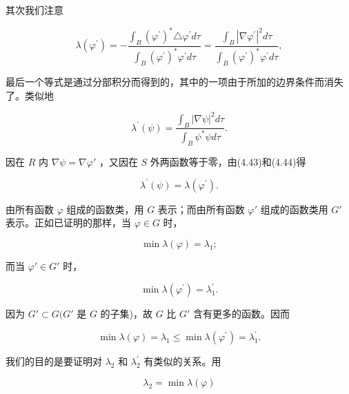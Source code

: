 其次我们注意

\begin{equation*}
\lambda \left(\varphi^ {\prime}\right) = - \frac {\int_ {B} \left(\varphi^ {\prime}\right) ^ {*} \triangle \varphi^ {\prime} d \tau}{\int_ {B} \left(\varphi^ {\prime}\right) ^ {*} \varphi^ {\prime} d \tau} = \frac {\int_ {B} \left| \nabla \varphi^ {\prime} \right| ^ {2} d \tau}{\int_ {B} \left(\varphi^ {\prime}\right) ^ {*} \varphi^ {\prime} d \tau},\tag{4.43}
\end{equation*}

最后一个等式是通过分部积分而得到的，其中的一项由于所加的边界条件而消失了。类似地

\begin{equation*}
\lambda^ {\prime} (\psi) = \frac {\int_ {B} | \nabla \psi | ^ {2} d \tau}{\int_ {B} \psi^ {*} \psi d \tau}.\tag{4.44}
\end{equation*}

因在 $R$ 内 $\nabla \psi = \nabla \varphi'$ ，又因在 $S$ 外两函数等于零，由(4.43)和(4.44)得

\begin{equation*}
\lambda^ {\prime} (\psi) = \lambda \left(\varphi^ {\prime}\right).\tag{4.45}
\end{equation*}

由所有函数 $\varphi$ 组成的函数类，用 $G$ 表示；而由所有函数 $\varphi'$ 组成的函数类用 $G'$ 表示。正如已证明的那样，当 $\varphi \in G$ 时，

\begin{equation*}
\min \lambda (\varphi) = \lambda_ {1};
\end{equation*}

而当 $\varphi' \in G'$ 时，

\begin{equation*}
\min \lambda (\varphi ^ {\prime}) = \lambda_ {1} ^ {\prime}.
\end{equation*}

因为 $G' \subset G(G'$ 是 $G$ 的子集)，故 $G$ 比 $G'$ 含有更多的函数。因而

\begin{equation*}
\min \lambda (\varphi) = \lambda_ {1} \leqslant \min \lambda \left(\varphi^ {\prime}\right) = \lambda_ {1} ^ {\prime}.\tag{4.46}
\end{equation*}

我们的目的是要证明对 $\lambda_{2}$ 和 $\lambda_{2}^{\prime}$ 有类似的关系。用

\begin{equation*}
\lambda_ {2} = \min \lambda (\varphi)
\end{equation*}

